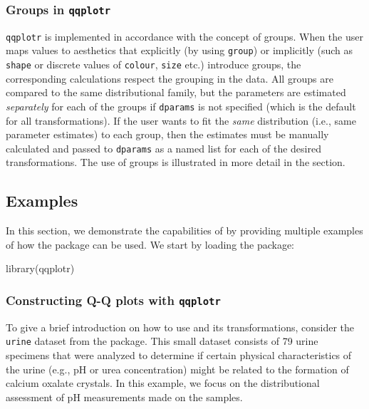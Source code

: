 \subsubsection{\texorpdfstring{Groups in
\texttt{qqplotr}}{Groups in qqplotr}}\label{groups-in-qqplotr}

\texttt{qqplotr} is implemented in accordance with the 
concept of groups. When the user maps values to aesthetics that
explicitly (by using \texttt{group}) or implicitly (such as
\texttt{shape} or discrete values of \texttt{colour}, \texttt{size}
etc.) introduce groups, the corresponding calculations respect the
grouping in the data. All groups are compared to the same distributional
family, but the parameters are estimated \emph{separately} for each of
the groups if \texttt{dparams} is not specified (which is the default
for all transformations). If the user wants to fit the \emph{same}
distribution (i.e., same parameter estimates) to each group, then the
estimates must be manually calculated and passed to \texttt{dparams} as
a named list for each of the desired  transformations. The
use of groups is illustrated in more detail in the 
section.

\FloatBarrier

\subsection{Examples}\label{examples}

\label{sec:examples}

In this section, we demonstrate the capabilities of  by
providing multiple examples of how the package can be used. We start by
loading the package:

\begin{Schunk}
\begin{Sinput}
library(qqplotr)
\end{Sinput}
\end{Schunk}

\subsubsection{\texorpdfstring{Constructing Q-Q plots with
\texttt{qqplotr}}{Constructing Q-Q plots with qqplotr}}\label{constructing-q-q-plots-with-qqplotr}

To give a brief introduction on how to use  and its
transformations, consider the \texttt{urine} dataset from the 
package. This small dataset consists of 79 urine specimens that were
analyzed to determine if certain physical characteristics of the urine
(e.g., pH or urea concentration) might be related to the formation of
calcium oxalate crystals. In this example, we focus on the
distributional assessment of pH measurements made on the samples.

